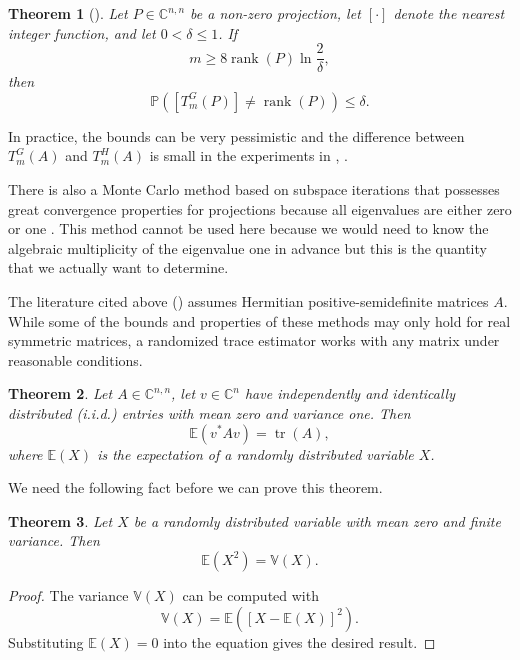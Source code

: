 \documentclass[%
	paper=a4,
	fontsize=10pt,
	DIV11,BCOR10mm,
	numbers=noenddot,
	abstract=yes
]{scrartcl}
\newcommand{\F}{\mathbb{C}}
\DeclareMathOperator{\rank}{rank}
\newtheorem{theorem}{Theorem}[section]
\theoremstyle{definition}
\begin{document}
\begin{theorem}[{\cite[Corollary~4]{Roosta-Khorasani2015}}]
	Let $P \in \F^{n,n}$ be a non-zero projection, let $[\cdot]$ denote the
	nearest integer function, and let $0 < \delta \leq 1$. If
	\[ m \geq 8 \rank(P) \ln \frac{2}{\delta}, \]
	then
	\[ \mathbb{P}\left( [T_m^G(P)] \neq \rank(P) \right) \leq \delta. \]
\end{theorem}

In practice, the bounds can be very pessimistic and the difference between
$T_m^G(A)$ and $T_m^H(A)$ is small in the experiments in
\cite[§5]{Roosta-Khorasani2015}, \cite[§9]{Avron2011}.

There is also a Monte Carlo method based on subspace iterations that possesses
great convergence properties for projections because all eigenvalues are either
zero or one \cite{Saibaba2016}. This method cannot be used here because we would
need to know the algebraic multiplicity of the eigenvalue one in advance but
this is the quantity that we actually want to determine.

The literature cited above (\cite{Avron2011,Roosta-Khorasani2015,Saibaba2016})
assumes Hermitian positive-semidefinite matrices $A$. While some of the bounds
and properties of these methods may only hold for real symmetric matrices, a
randomized trace estimator works with any matrix under reasonable conditions.

\begin{theorem}
\label{thm:general-trace-expectation}
	Let $A \in \F^{n,n}$, let $v \in \F^n$ have independently and identically
	distributed (i.i.d.) entries with mean zero and variance one. Then
	\[ \mathbb{E}( v^* A v ) = \operatorname{tr}(A), \]
	where $\mathbb{E}(X)$ is the expectation of a randomly distributed
	variable $X$.
\end{theorem}

We need the following fact before we can prove this theorem.

\begin{theorem}
	Let $X$ be a randomly distributed variable with mean zero and finite
	variance. Then
	\[ \mathbb{E}(X^2) = \mathbb{V}(X). \]
\end{theorem}

\begin{proof}
	The variance $\mathbb{V}(X)$ can be computed with \cite[§24.6]{Kreyszig2011}
	\[ \mathbb{V}(X) = \mathbb{E}([X - \mathbb{E}(X)]^2). \]
	Substituting $\mathbb{E}(X) = 0$ into the equation gives the desired result.
\end{proof}
\end{document}
